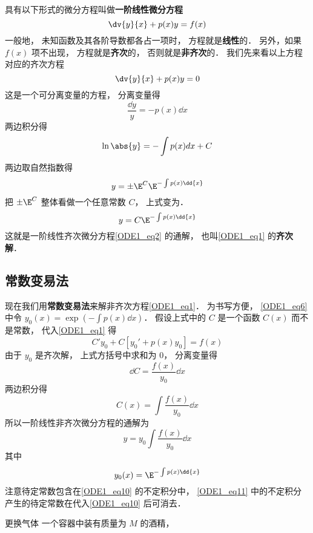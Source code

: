 
\begin{issues}
\issueNeedCite
{}
\end{issues}


具有以下形式的微分方程叫做\textbf{一阶线性微分方程}
\begin{equation}\label{ODE1_eq1}
\dv{y}{x} + p(x)y = f(x)
\end{equation}
一般地， 未知函数及其各阶导数都各占一项时， 方程就是\textbf{线性}的． 另外，如果 $f(x)$ 项不出现， 方程就是\textbf{齐次}的， 否则就是\textbf{非齐次}的． 我们先来看以上方程对应的齐次方程
\begin{equation}\label{ODE1_eq2}
\dv{y}{x} + p(x)y = 0
\end{equation}
这是一个可分离变量的方程， 分离变量得
\begin{equation}
\frac{\dd{y}}{y} = -p(x) \dd{x}
\end{equation}
两边积分得
\begin{equation}
\ln\abs{y} = -\int p(x) dx + C
\end{equation}
两边取自然指数得
\begin{equation}
y = \pm \E^C \E^{-\int p(x) \dd{x}}
\end{equation}
把 $\pm \E^C $ 整体看做一个任意常数 $C$， 上式变为．
\begin{equation}\label{ODE1_eq6}
y = C \E^{-\int p(x) \dd{x}}
\end{equation}
这就是一阶线性齐次微分方程\autoref{ODE1_eq2} 的通解， 也叫\autoref{ODE1_eq1} 的\textbf{齐次解}．

\subsection{常数变易法}

现在我们用\textbf{常数变易法}来解非齐次方程\autoref{ODE1_eq1}． 为书写方便， \autoref{ODE1_eq6} 中令 $y_0(x) = \exp(-\int p(x) \dd{x})$． 假设上式中的 $C$ 是一个函数 $C(x)$ 而不是常数， 代入\autoref{ODE1_eq1} 得
\begin{equation}
C'y_0 + C[y_0' + p(x)y_0] = f(x)
\end{equation}
由于 $y_0$ 是齐次解， 上式方括号中求和为 0， 分离变量得
\begin{equation}
\dd{C}= \frac{f(x)}{y_0} \dd{x}
\end{equation}
两边积分得
\begin{equation}
C(x) = \int \frac{f(x)}{y_0} \dd{x}
\end{equation}
所以一阶线性非齐次微分方程的通解为
\begin{equation}\label{ODE1_eq10}
y = y_0  \int \frac{f(x)}{y_0} \dd{x}
\end{equation}
其中
\begin{equation}\label{ODE1_eq11}
y_0(x) = \E^{-\int p(x) \dd{x}}
\end{equation}
注意待定常数包含在\autoref{ODE1_eq10} 的不定积分中， \autoref{ODE1_eq11} 中的不定积分产生的待定常数在代入\autoref{ODE1_eq10} 后可消去．

\begin{example}{更换气体}
一个容器中装有质量为 $M$ 的酒精， 
\end{example}
